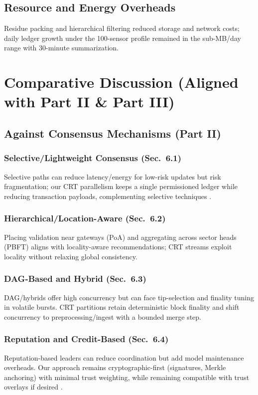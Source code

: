 \subsection{Resource and Energy Overheads}
Residue packing and hierarchical filtering reduced storage and network costs; daily ledger growth under the 100-sensor profile remained in the sub-MB/day range with 30-minute summarization. %

\section{Comparative Discussion (Aligned with Part II \& Part III)}

\subsection{Against Consensus Mechanisms (Part II)}
\subsubsection{Selective/Lightweight Consensus (Sec.~6.1)}
Selective paths can reduce latency/energy for low-risk updates but risk fragmentation; our CRT parallelism keeps a single permissioned ledger while reducing transaction payloads, complementing selective techniques \cite{ali2022blockchainenabledarchitecture}.

\subsubsection{Hierarchical/Location-Aware (Sec.~6.2)}
Placing validation near gateways (PoA) and aggregating across sector heads (PBFT) aligns with locality-aware recommendations; CRT streams exploit locality without relaxing global consistency.

\subsubsection{DAG-Based and Hybrid (Sec.~6.3)}
DAG/hybrids offer high concurrency but can face tip-selection and finality tuning in volatile bursts. CRT partitions retain deterministic block finality and shift concurrency to preprocessing/ingest with a bounded merge step.

\subsubsection{Reputation and Credit-Based (Sec.~6.4)}
Reputation-based leaders can reduce coordination but add model maintenance overheads. Our approach remains cryptographic-first (signatures, Merkle anchoring) with minimal trust weighting, while remaining compatible with trust overlays if desired \cite{morais2023surveyonintegration}.

